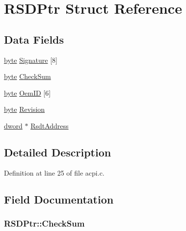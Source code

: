 \hypertarget{structRSDPtr}{}\section{R\+S\+D\+Ptr Struct Reference}
\label{structRSDPtr}
\subsection*{Data Fields}
\begin{DoxyCompactItemize}
\item 
\hyperlink{acpi_8c_a0c8186d9b9b7880309c27230bbb5e69d}{byte} \hyperlink{structRSDPtr_ae3efa3d06b7688110654bd24df504270}{Signature} \mbox{[}8\mbox{]}
\item 
\hyperlink{acpi_8c_a0c8186d9b9b7880309c27230bbb5e69d}{byte} \hyperlink{structRSDPtr_a97114fb497c50827e574cc983548073d}{Check\+Sum}
\item 
\hyperlink{acpi_8c_a0c8186d9b9b7880309c27230bbb5e69d}{byte} \hyperlink{structRSDPtr_abdc8155e2acf415b30213793e4875306}{Oem\+ID} \mbox{[}6\mbox{]}
\item 
\hyperlink{acpi_8c_a0c8186d9b9b7880309c27230bbb5e69d}{byte} \hyperlink{structRSDPtr_aa7a0f77fcedb849e6a3d5eb68a5df4cb}{Revision}
\item 
\hyperlink{acpi_8c_a74cb93d430006e784da73b8ca406ee6e}{dword} $\ast$ \hyperlink{structRSDPtr_a982825bea34910320148af4114ba8e00}{Rsdt\+Address}
\end{DoxyCompactItemize}


\subsection{Detailed Description}


Definition at line 25 of file acpi.\+c.



\subsection{Field Documentation}
\subsubsection[{\texorpdfstring{Check\+Sum}{CheckSum}}]{ R\+S\+D\+Ptr\+::\+Check\+Sum}\hypertarget{structRSDPtr_a97114fb497c50827e574cc983548073d}{}\label{structRSDPtr_a97114fb497c50827e574cc983548073d}


